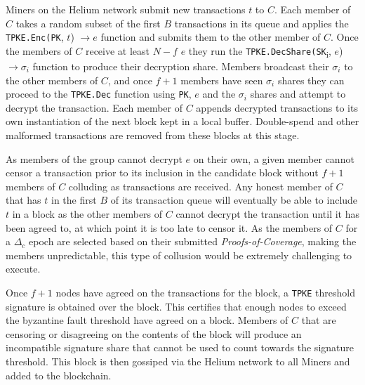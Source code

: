 \documentclass[10pt, nonatbib, nocopyrightspace, reprint]{sigplanconf}
\begin{document}
Miners on the Helium network submit new transactions $t$ to $C$. Each member of $C$ takes a random subset of the first $B$ transactions in its queue and applies the \verb|TPKE.Enc(PK|, $t$) $\rightarrow e$ function and submits them to the other member of $C$. Once the members of $C$ receive at least $N-f$ $e$ they run the \verb|TPKE.DecShare(SK|\textsubscript{i}, $e$) $\rightarrow \sigma_i$ function to produce their decryption share. Members broadcast their $\sigma_i$ to the other members of $C$, and once $f + 1$ members have seen $\sigma_i$ shares they can proceed to the \verb|TPKE.Dec| function using \verb|PK|, $e$ and the $\sigma_i$ shares and attempt to decrypt the transaction. Each member of $C$ appends decrypted transactions to its own instantiation of the next block kept in a local buffer. Double-spend and other malformed transactions are removed from these blocks at this stage.

As members of the group cannot decrypt $e$ on their own, a given member cannot censor a transaction prior to its inclusion in the candidate block without $f + 1$ members of $C$ colluding as transactions are received. Any honest member of $C$ that has $t$ in the first $B$ of its transaction queue will eventually be able to include $t$ in a block as the other members of $C$ cannot decrypt the transaction until it has been agreed to, at which point it is too late to censor it. As the members of $C$ for a $\Delta_c$ epoch are selected based on their submitted \emph{Proofs-of-Coverage}, making the members unpredictable, this type of collusion would be extremely challenging to execute.

Once $f+1$ nodes have agreed on the transactions for the block, a \verb|TPKE| threshold signature is obtained over the block. This certifies that enough nodes to exceed the byzantine fault threshold have agreed on a block. Members of $C$ that are censoring or disagreeing on the contents of the block will produce an incompatible signature share that cannot be used to count towards the signature threshold. This block is then gossiped via the Helium network to all Miners and added to the blockchain.
\end{document}
